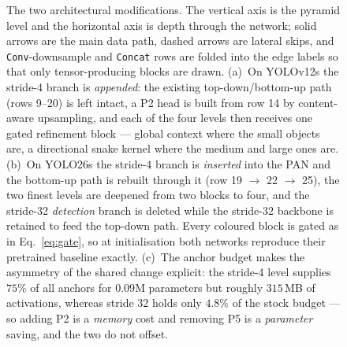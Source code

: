 \begin{figure}[t]
\fi
\caption{The two architectural modifications. The vertical axis is the pyramid level and the horizontal axis is depth through the network; solid arrows are
the main data path, dashed arrows are lateral skips, and \texttt{Conv}-downsample and \texttt{Concat} rows are folded into the edge labels so that only
tensor-producing blocks are drawn. (a)~On YOLOv12s the stride-4 branch is \emph{appended}: the existing top-down/bottom-up path (rows 9--20) is left intact, a
P2 head is built from row 14 by content-aware upsampling, and each of the four levels then receives one gated refinement block --- global context where the
small objects are, a directional snake kernel where the medium and large ones are. (b)~On YOLO26s the stride-4 branch is \emph{inserted} into the PAN and the
bottom-up path is rebuilt through it (row 19 $\rightarrow$ 22 $\rightarrow$ 25), the two finest levels are deepened from two blocks to four, and the stride-32
\emph{detection} branch is deleted while the stride-32 backbone is retained to feed the top-down path. Every coloured block is gated as in
Eq.~\eqref{eq:gate}, so at initialisation both networks reproduce their pretrained baseline exactly. (c)~The anchor budget makes the asymmetry of the shared
change explicit: the stride-4 level supplies $75\%$ of all anchors for $0.09$M parameters but roughly $315$\,MB of activations, whereas stride 32 holds only
$4.8\%$ of the stock budget --- so adding P2 is a \emph{memory} cost and removing P5 is a \emph{parameter} saving, and the two do not offset.}
\label{fig:arch}
\end{figure}
